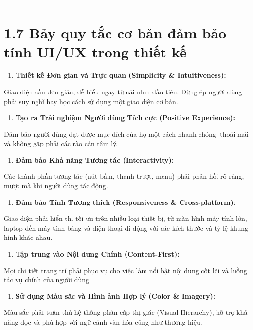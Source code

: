 \documentclass[11pt,a4paper,oneside]{report}
\begin{document}
\bigskip\hrule\bigskip

\section{1.7 Bảy quy tắc cơ bản đảm bảo tính UI/UX trong thiết kế}

\begin{enumerate}[leftmargin=1.5em]
\item \textbf{Thiết kế Đơn giản và Trực quan (Simplicity \& Intuitiveness):}  
\end{enumerate}
Giao diện cần đơn giản, dễ hiểu ngay từ cái nhìn đầu tiên. Đừng ép người dùng phải suy nghĩ hay học cách sử dụng một giao diện cơ bản.

\begin{enumerate}[leftmargin=1.5em]
\item \textbf{Tạo ra Trải nghiệm Người dùng Tích cực (Positive Experience):}  
\end{enumerate}
Đảm bảo người dùng đạt được mục đích của họ một cách nhanh chóng, thoải mái và không gặp phải các rào cản tâm lý.

\begin{enumerate}[leftmargin=1.5em]
\item \textbf{Đảm bảo Khả năng Tương tác (Interactivity):}  
\end{enumerate}
Các thành phần tương tác (nút bấm, thanh trượt, menu) phải phản hồi rõ ràng, mượt mà khi người dùng tác động.

\begin{enumerate}[leftmargin=1.5em]
\item \textbf{Đảm bảo Tính Tương thích (Responsiveness \& Cross-platform):}  
\end{enumerate}
Giao diện phải hiển thị tối ưu trên nhiều loại thiết bị, từ màn hình máy tính lớn, laptop đến máy tính bảng và điện thoại di động với các kích thước và tỷ lệ khung hình khác nhau.

\begin{enumerate}[leftmargin=1.5em]
\item \textbf{Tập trung vào Nội dung Chính (Content-First):}  
\end{enumerate}
Mọi chi tiết trang trí phải phục vụ cho việc làm nổi bật nội dung cốt lõi và luồng tác vụ chính của người dùng.

\begin{enumerate}[leftmargin=1.5em]
\item \textbf{Sử dụng Màu sắc và Hình ảnh Hợp lý (Color \& Imagery):}  
\end{enumerate}
Màu sắc phải tuân thủ hệ thống phân cấp thị giác (Visual Hierarchy), hỗ trợ khả năng đọc và phù hợp với ngữ cảnh văn hóa cũng như thương hiệu.
\end{document}
